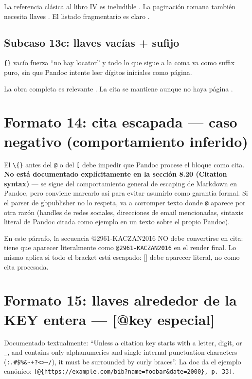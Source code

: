 \documentclass{article}
\begin{document}
La referencia clásica al libro IV es ineludible \autocite[\{libro IV, cap. 3\}]{3041-PINEAU1999}. La paginación romana también necesita llaves \autocite[p. xiv]{3036-ORBUCH2020}. El listado fragmentario es claro \autocite[\{pp. iv, vi-xi, (xv)-(xvii)\}]{3036-ORBUCH2020}.


\subsection{Subcaso 13c: llaves vacías + sufijo}
\texttt{\{\}} vacío fuerza “no hay locator” y todo lo que sigue a la coma va como suffix puro, sin que Pandoc intente leer dígitos iniciales como página.

La obra completa es relevante \autocite[sin paginación específica]{3036-ORBUCH2020}. La cita se mantiene aunque no haya página \autocite[passim]{2961-KACZAN2016}.



\section{Formato 14: cita escapada — caso negativo (comportamiento inferido)}
El \texttt{\textbackslash\{\}} antes del \texttt{@} o del \texttt{[} debe impedir que Pandoc procese el bloque como cita. \textbf{No está documentado explícitamente en la sección 8.20 (Citation syntax)} — se sigue del comportamiento general de escaping de Markdown en Pandoc, pero conviene marcarlo así para evitar asumirlo como garantía formal. Si el parser de gbpublisher no lo respeta, va a corromper texto donde \texttt{@} aparece por otra razón (handles de redes sociales, direcciones de email mencionadas, sintaxis literal de Pandoc citada como ejemplo en un texto sobre el propio Pandoc).

En este párrafo, la secuencia @2961-KACZAN2016 NO debe convertirse en cita: tiene que aparecer literalmente como \texttt{@2961-KACZAN2016} en el render final. Lo mismo aplica si todo el bracket está escapado: [\textcite{3041-PINEAU1999}] debe aparecer literal, no como cita procesada.


\section{Formato 15: llaves alrededor de la KEY entera — [@{key especial}]}
Documentado textualmente: “Unless a citation key starts with a letter, digit, or \texttt{\_}, and contains only alphanumerics and single internal punctuation characters (\texttt{:.\#\$\%\&-+?<>\textasciitilde{}/}), it must be surrounded by curly braces”. La doc da el ejemplo canónico: \texttt{[@\{https://example.com/bib?name=foobar\&date=2000\}, p. 33]}.
\end{document}
